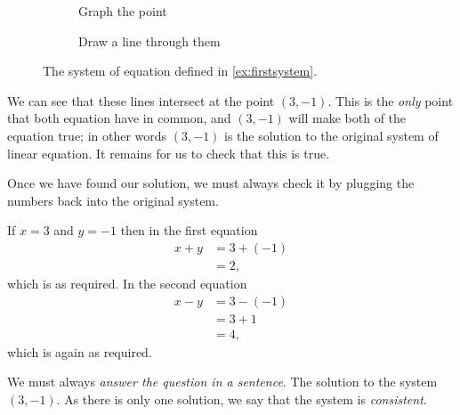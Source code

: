 \begin{myProof}
	\begin{figure}[!h]
		\begin{subfigure}{.5\textwidth}
			\centering
			\caption{Graph the point}
		\end{subfigure}
		\begin{subfigure}{.5\textwidth}
			\centering
			\caption{Draw a line through them}
		\end{subfigure}
		\caption{The system of equation defined in \cref{ex:firstsystem}.}
	\end{figure}
	\FloatBarrier
																																									
	We can see that these lines intersect at the point $(3,-1)$. This is the {\em only}
	point that both equation have in common, and $(3,-1)$ will make both of the equation
	true; in other words $(3,-1)$ is the solution to the original system of linear equation. It
	remains for us to check that this is true.
																																									
	Once we have found our solution, we must always check it by plugging the numbers
	back into the original system.
																																									
	If $x=3$ and $y=-1$ then in the first equation
	\begin{align*}
		x+y & =	3+(-1) \\
		    & =	2,     
	\end{align*}
	which is as required. In the second equation
	\begin{align*}
		x-y & =	3-(-1) \\
		    & =	3+1    \\
		    & =	4,     
	\end{align*}
	which is again as required. 
																																									
	We must always {\em answer the question in a sentence}. The solution to the system $(3,-1)$. 
	As there is only one solution, we say that the system is {\em consistent}.
\end{myProof}
																											
